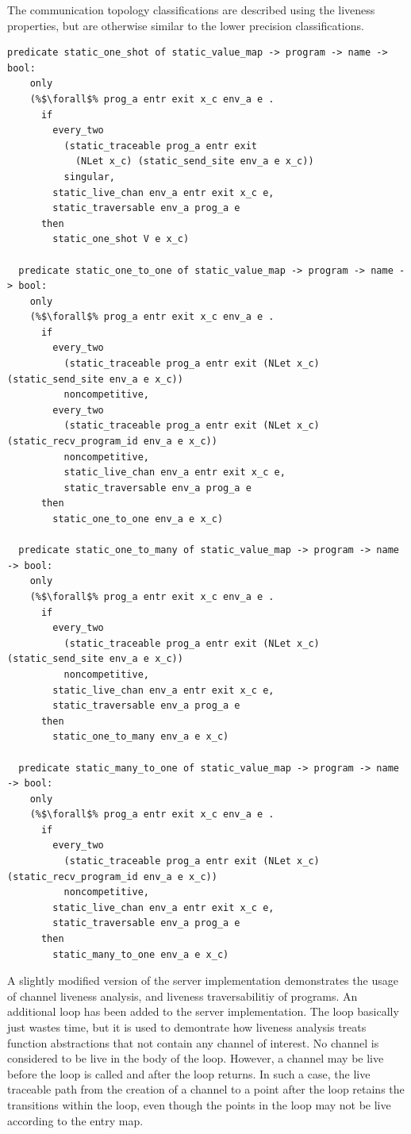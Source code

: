 \documentclass{article}
\begin{document}
The communication topology classifications are described using the liveness properties, but
are otherwise similar to the lower precision classifications.

\begin{lstlisting}[language=logic, escapechar=\%]
  predicate static_one_shot of static_value_map -> program -> name -> bool:
    only
    (%$\forall$% prog_a entr exit x_c env_a e . 
      if
        every_two
          (static_traceable prog_a entr exit
            (NLet x_c) (static_send_site env_a e x_c))
          singular, 
        static_live_chan env_a entr exit x_c e, 
        static_traversable env_a prog_a e
      then
        static_one_shot V e x_c)

  predicate static_one_to_one of static_value_map -> program -> name -> bool:
    only
    (%$\forall$% prog_a entr exit x_c env_a e .
      if
        every_two
          (static_traceable prog_a entr exit (NLet x_c) (static_send_site env_a e x_c))
          noncompetitive, 
        every_two
          (static_traceable prog_a entr exit (NLet x_c) (static_recv_program_id env_a e x_c))
          noncompetitive,
          static_live_chan env_a entr exit x_c e,
          static_traversable env_a prog_a e
      then
        static_one_to_one env_a e x_c)

  predicate static_one_to_many of static_value_map -> program -> name -> bool:
    only
    (%$\forall$% prog_a entr exit x_c env_a e .
      if
        every_two
          (static_traceable prog_a entr exit (NLet x_c) (static_send_site env_a e x_c))
          noncompetitive,
        static_live_chan env_a entr exit x_c e,
        static_traversable env_a prog_a e
      then
        static_one_to_many env_a e x_c)

  predicate static_many_to_one of static_value_map -> program -> name -> bool:
    only
    (%$\forall$% prog_a entr exit x_c env_a e .
      if
        every_two
          (static_traceable prog_a entr exit (NLet x_c) (static_recv_program_id env_a e x_c))
          noncompetitive, 
        static_live_chan env_a entr exit x_c e,
        static_traversable env_a prog_a e
      then
        static_many_to_one env_a e x_c)
  \end{lstlisting}


A slightly modified version of the server implementation demonstrates the usage of channel liveness
analysis, and liveness traversabilitiy of programs.  An additional loop has been added to the
server implementation.  The loop basically just wastes time, but it is used to demontrate how
liveness analysis treats function abstractions that not contain
any channel of interest.  No channel is
considered to be live in the body of the loop.  However, a channel may be live before the loop is
called and after the loop returns.  In such a case, the live traceable path from the creation of a
channel to a point after the loop retains the transitions within the loop, even though the points in
the loop may not be live according to the entry map.
\end{document}
